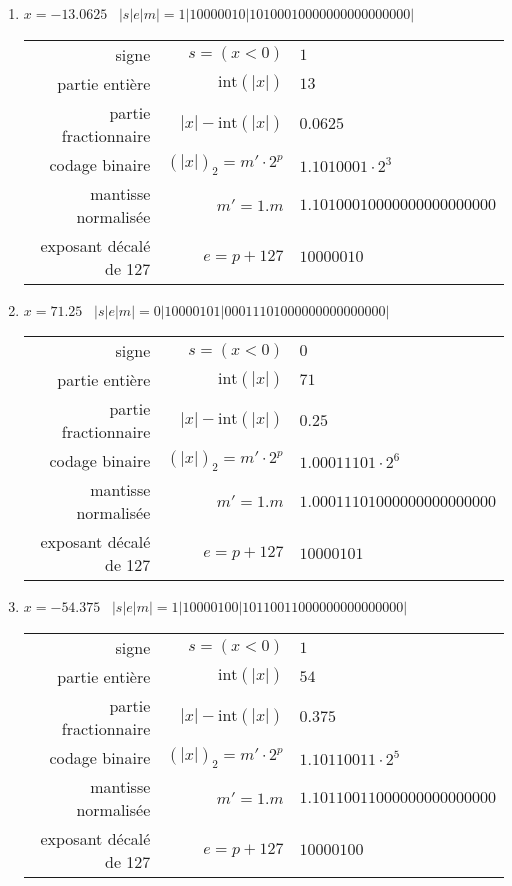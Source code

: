 \documentclass[11pt,a4paper]{article}
\begin{document}
\begin{enumerate}
\item $x = -13.0625$ \dotfill\ {$|s|e|m| = 1|10000010|10100010000000000000000|$}
{\footnotesize
\begin{tabular}{r@{ : }r@{ $=$ }l}
signe 					& $s = (x < 0)$ 			& $1$ \\
partie entière 			& $\mbox{int}(|x|)$ 		& $13$ \\
partie fractionnaire 	& $|x| - \mbox{int}(|x|)$ 	& $0.0625$ \\
codage binaire 			& $(|x|)_2 = m'\cdot 2^p$   & $1.1010001 \cdot 2^{3}$ \\
mantisse normalisée 	& $m' = 1.m$ 				& $1.10100010000000000000000$ \\
exposant décalé de 127 	& $e = p+127$ 				& $10000010$ \\[2mm]
\end{tabular}
}

\item $x = 71.25$ \dotfill\ {$|s|e|m| = 0|10000101|00011101000000000000000|$}
{\footnotesize
\begin{tabular}{r@{ : }r@{ $=$ }l}
signe 					& $s = (x < 0)$ 			& $0$ \\
partie entière 			& $\mbox{int}(|x|)$ 		& $71$ \\
partie fractionnaire 	& $|x| - \mbox{int}(|x|)$ 	& $0.25$ \\
codage binaire 			& $(|x|)_2 = m'\cdot 2^p$   & $1.00011101 \cdot 2^{6}$ \\
mantisse normalisée 	& $m' = 1.m$ 				& $1.00011101000000000000000$ \\
exposant décalé de 127 	& $e = p+127$ 				& $10000101$ \\[2mm]
\end{tabular}
}

\item $x = -54.375$ \dotfill\ {$|s|e|m| = 1|10000100|10110011000000000000000|$}
{\footnotesize
\begin{tabular}{r@{ : }r@{ $=$ }l}
signe 					& $s = (x < 0)$ 			& $1$ \\
partie entière 			& $\mbox{int}(|x|)$ 		& $54$ \\
partie fractionnaire 	& $|x| - \mbox{int}(|x|)$ 	& $0.375$ \\
codage binaire 			& $(|x|)_2 = m'\cdot 2^p$   & $1.10110011 \cdot 2^{5}$ \\
mantisse normalisée 	& $m' = 1.m$ 				& $1.10110011000000000000000$ \\
exposant décalé de 127 	& $e = p+127$ 				& $10000100$ \\[2mm]
\end{tabular}
}


\end{enumerate}
\end{document}
